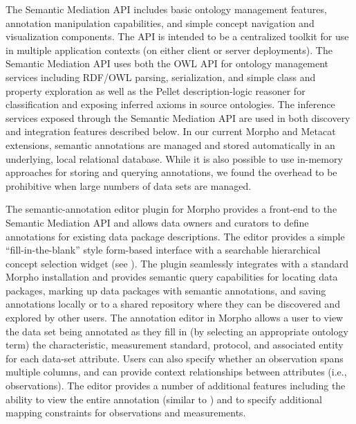  The Semantic Mediation API
includes basic ontology management features, annotation manipulation
capabilities, and simple concept navigation and visualization
components. The API is intended to be a centralized toolkit for use in
multiple application contexts (on either client or server
deployments).  The Semantic Mediation API uses both the OWL API
\cite{owlapi} for ontology management services including RDF/OWL
parsing, serialization, and simple class and property exploration as
well as the Pellet description-logic reasoner \cite{pellet} for
classification and exposing inferred axioms in source ontologies. The
inference services exposed through the Semantic Mediation API are used
in both discovery and integration features described below.
In our current Morpho and Metacat extensions, semantic annotations are
managed and stored automatically in an underlying, local relational
database. While it is also possible to use in-memory approaches for
storing and querying annotations, we found the overhead to be
prohibitive when large numbers of data sets are managed.




  The semantic-annotation editor
plugin for Morpho provides a front-end to the Semantic Mediation API
and allows data owners and curators to define annotations for existing data package
descriptions. The editor provides a simple ``fill-in-the-blank'' style
form-based interface with a searchable hierarchical concept selection
widget (see ). The plugin seamlessly
integrates with a standard Morpho installation and provides semantic
query capabilities for locating data packages, marking up data
packages with semantic annotations, and saving annotations locally or
to a shared repository where they can be discovered and explored by
other users. The annotation editor in Morpho allows a user to view the
data set being annotated as they fill in (by selecting an appropriate
ontology term) the characteristic, measurement standard, protocol, and
associated entity for each data-set attribute. Users can also specify
whether an observation spans multiple columns, and can provide context
relationships between attributes (i.e., observations). The editor
provides a number of additional features including the ability to
view the entire annotation (similar to )
and to specify additional mapping constraints for observations and
measurements.

